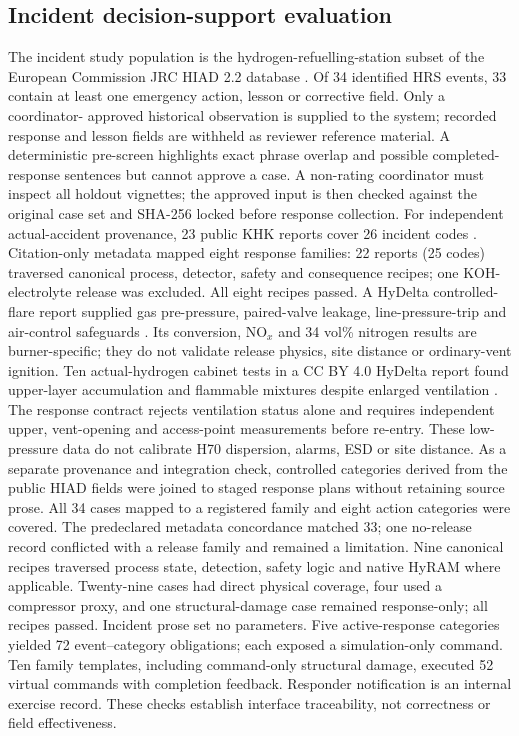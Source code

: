 \documentclass[12pt,a4paper]{article}
\begin{document}
\subsection{Incident decision-support evaluation}
The incident study population is the hydrogen-refuelling-station subset of the
European Commission JRC HIAD 2.2 database \cite{hiad2026}. Of 34 identified HRS events, 33 contain
at least one emergency action, lesson or corrective field. Only a coordinator-
approved historical observation is supplied to the system; recorded response and
lesson fields are withheld as reviewer reference material. A deterministic
pre-screen highlights exact phrase overlap and possible completed-response
sentences but cannot approve a case. A non-rating coordinator must inspect all
holdout vignettes; the approved input is then checked against the original case
set and SHA-256 locked before response collection.
For independent actual-accident provenance, 23 public KHK reports cover 26
incident codes \cite{khk2026}. Citation-only metadata mapped eight response
families: 22 reports (25 codes) traversed canonical process, detector, safety and
consequence recipes; one KOH-electrolyte release was excluded. All eight recipes
passed.
A HyDelta controlled-flare report supplied gas pre-pressure, paired-valve
leakage, line-pressure-trip and air-control safeguards \cite{hydelta2026}.
Its conversion, NO$_x$ and 34 vol\% nitrogen results are burner-specific; they
do not validate release physics, site distance or ordinary-vent ignition.
Ten actual-hydrogen cabinet tests in a CC BY 4.0 HyDelta report found
upper-layer accumulation and flammable mixtures despite enlarged ventilation
\cite{hydelta2023ventilation}. The response contract rejects ventilation status
alone and requires independent upper, vent-opening and access-point
measurements before re-entry. These low-pressure data do not calibrate H70
dispersion, alarms, ESD or site distance.
As a separate provenance and integration check, controlled categories derived
from the public HIAD fields were joined to staged response plans without
retaining source prose. All 34 cases mapped to a registered family and eight
action categories were covered. The predeclared metadata concordance matched 33;
one no-release record conflicted with a release family and remained a
limitation. Nine canonical recipes traversed process state, detection, safety
logic and native HyRAM where applicable. Twenty-nine cases had direct physical
coverage, four used a compressor proxy, and one structural-damage case remained
response-only; all recipes passed. Incident prose set no parameters.
Five active-response categories yielded 72 event--category obligations; each
exposed a simulation-only command. Ten family templates, including command-only
structural damage, executed 52 virtual commands with completion feedback.
Responder notification is an internal exercise record. These checks establish
interface traceability, not correctness or field effectiveness.
\end{document}
